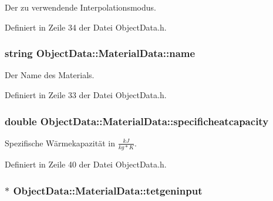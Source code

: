 Der zu verwendende Interpolationsmodus. 



Definiert in Zeile 34 der Datei Object\-Data.\-h.

\hypertarget{structObjectData_1_1MaterialData_a795f1265218b9a125559bbe9231f3c8d}{
\subsubsection[{name}]{\setlength{\rightskip}{0pt plus 5cm}string Object\-Data\-::\-Material\-Data\-::name}}\label{structObjectData_1_1MaterialData_a795f1265218b9a125559bbe9231f3c8d}


Der Name des Materials. 



Definiert in Zeile 33 der Datei Object\-Data.\-h.

\hypertarget{structObjectData_1_1MaterialData_a784e2b70f98d146979fd422d41445fea}{
\subsubsection[{specificheatcapacity}]{\setlength{\rightskip}{0pt plus 5cm}double Object\-Data\-::\-Material\-Data\-::specificheatcapacity}}\label{structObjectData_1_1MaterialData_a784e2b70f98d146979fd422d41445fea}


Spezifische Wärmekapazität in $\frac{kJ}{kg*K}$. 



Definiert in Zeile 40 der Datei Object\-Data.\-h.

\hypertarget{structObjectData_1_1MaterialData_ab752395b4aedbe011fa49de7fbbd36ee}{
\subsubsection[{tetgeninput}]{$\ast$ Object\-Data\-::\-Material\-Data\-::tetgeninput}}\label{structObjectData_1_1MaterialData_ab752395b4aedbe011fa49de7fbbd36ee}



